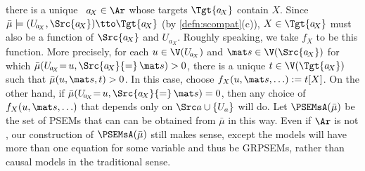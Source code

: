 {    there is a unique
    \arc\ $a_{\!X} \in \Ar$ whose targets $\Tgt {a_{\!X}}$ contain $X$.
Since
$\bar\mu \models ( U_{\!a_{\!X}}, \Src{a_{\!X}}) \tto \Tgt {a_{\!X}}$
(by \cref{defn:scompat}(c)),
$X \in \Tgt {a_{\!X}}$ must also be 
a function of $\Src{a_{\!X}}$ and $U_{\!a_{\!X}}$.
Roughly speaking, we take $f_X$ to be this function. 
More precisely,
for each $u \in \V (U_{\!a_{\!X}})$ and $\mat s \in \V (\Src {a_{\!X}})$
for which $\bar\mu(U_{\!a_{\!X}} {=}\, u, \Src {a_{\!X}} {=}\, \mat s) > 0$,
there is a unique
 $t \in \V (\Tgt {a_{\!X}})$ such that $\bar\mu(u,\mat s, t) > 0$.
In this case, choose $f_X(u, \mat s, \ldots) := t[X]$.
On the other hand, if $\bar\mu(U_{\!a_{\!X}} {=}\, u, \Src {a_{\!X}} {=}\, \mat s) = 0$,
then any choice of $f_X(u, \mat s, \ldots)$ that depends only on $\Src a \cup \{U_a\}$ will do.
Let 
$\PSEMsA(\bar\mu)$
be the set of PSEMs that can can be obtained from $\bar\mu$
    in this way.
Even if $\Ar$ is not \subpartl, our construction of $\PSEMsA(\bar\mu)$ still makes sense, except the models will have more than one equation for some variable and thus be GRPSEMs, rather than causal models in the traditional sense. 
}

